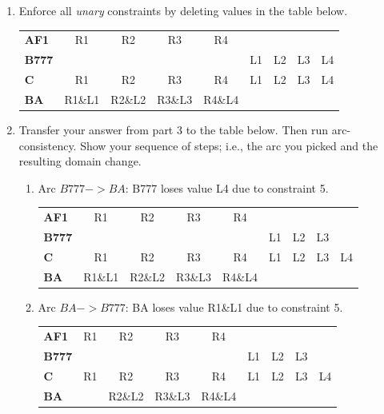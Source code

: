 \documentclass[11pt]{article}
\begin{document}
\begin{enumerate}
\item Enforce all {\it unary} constraints by deleting values in the table below.

\begin{center}\begin{tabular}{l|cccccccc|}
{\bf AF1}  & R1 & R2 & R3 & R4 & & & & \\ 
{\bf B777} & & & & & L1 & L2 & L3 & L4 \\ 
{\bf C}    & R1 & R2 & R3 & R4 & L1 & L2 & L3 & L4 \\ 
{\bf BA}   & R1\&L1 & R2\&L2 & R3\&L3 & R4\&L4 &  &  &  &  \\ 
\end{tabular}\end{center}

\item Transfer your answer from part 3 to the table below. Then run
  arc-consistency.  Show your sequence of steps; i.e., the arc you
  picked and the resulting domain change.

  \begin{enumerate}

  \item Arc $B777->BA$:  B777 loses value L4 due to constraint 5.
\begin{center}\begin{tabular}{l|cccccccc|}
{\bf AF1}  & R1 & R2 & R3 & R4 & & & & \\ 
{\bf B777} & & & & & L1 & L2 & L3 & \\ 
{\bf C}    & R1 & R2 & R3 & R4 & L1 & L2 & L3 & L4 \\ 
{\bf BA}   & R1\&L1 & R2\&L2 & R3\&L3 & R4\&L4 &  &  &  &  \\ 
\end{tabular}\end{center}

  \item Arc $BA->B777$:  BA loses value R1\&L1 due to constraint 5.
\begin{center}\begin{tabular}{l|cccccccc|}
{\bf AF1}  & R1 & R2 & R3 & R4 & & & & \\ 
{\bf B777} & & & & & L1 & L2 & L3 & \\ 
{\bf C}    & R1 & R2 & R3 & R4 & L1 & L2 & L3 & L4 \\ 
{\bf BA}   & & R2\&L2 & R3\&L3 & R4\&L4 &  &  &  &  \\ 
\end{tabular}\end{center}


\end{enumerate}
\end{enumerate}
\end{document}
